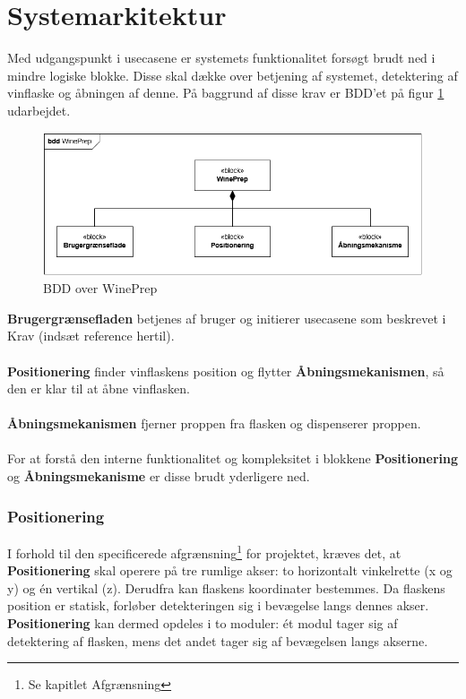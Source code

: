 \section{Systemarkitektur}
\label{sec:Arkitektur}
Med udgangspunkt i usecasene er systemets funktionalitet forsøgt brudt ned i mindre logiske blokke. Disse skal dække over betjening af systemet, detektering af vinflaske og åbningen af denne. På baggrund af disse krav er BDD'et på figur \ref{BDD_WinePrep} udarbejdet.

\begin{figure}[H]
	\centerline{\includegraphics[scale=0.33]{tex/Arkitektur/Diagrammer/BDD_WinePrep}}
	\caption{BDD over WinePrep}
	\label{BDD_WinePrep}
\end{figure}

\noindent\textbf{Brugergrænsefladen} betjenes af bruger og initierer usecasene som beskrevet i Krav (indsæt reference hertil).
\\
\\
\textbf{Positionering} finder vinflaskens position og flytter \textbf{Åbningsmekanismen}, så den er klar til at åbne vinflasken.
\\
\\
\textbf{Åbningsmekanismen} fjerner proppen fra flasken og dispenserer proppen.
\\
\\
For at forstå den interne funktionalitet og kompleksitet i blokkene \textbf{Positionering} og \textbf{Åbningsmekanisme} er disse brudt yderligere ned.

\subsubsection{Positionering}
I forhold til den specificerede afgrænsning\footnote{Se kapitlet Afgrænsning} for projektet, kræves det, at \textbf{Positionering} skal operere på tre rumlige akser: to horizontalt vinkelrette (x og y) og én vertikal (z). Derudfra kan flaskens koordinater bestemmes. Da flaskens position er statisk, forløber detekteringen sig i bevægelse langs dennes akser. \textbf{Positionering} kan dermed opdeles i to moduler: ét modul tager sig af detektering af flasken, mens det andet tager sig af bevægelsen langs akserne.

